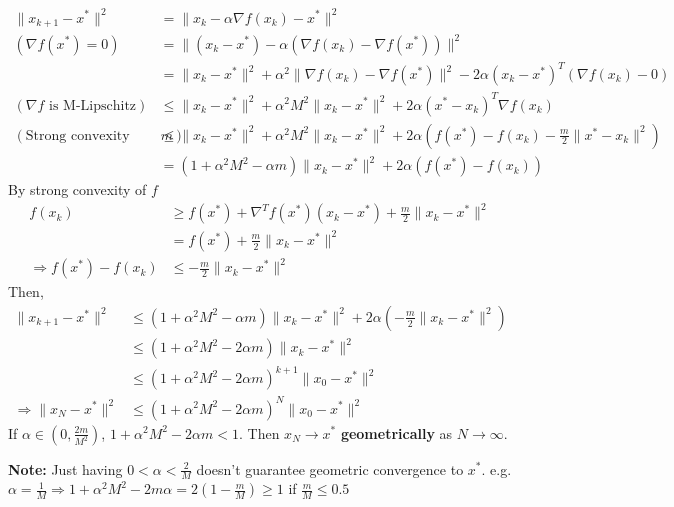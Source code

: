 \documentclass[11pt]{elegantbook}
\begin{document}
\begin{equation}
    \begin{aligned}
        \|x_{k+1}-x^*\|^2&=\|x_k-\alpha \nabla f(x_k)-x^*\|^2\\
        (\nabla f(x^*)=0)\quad \quad &=\|(x_k-x^*)-\alpha (\nabla f(x_k)-\nabla f(x^*))\|^2\\
        &=\|x_k-x^*\|^2+\alpha^2\|\nabla f(x_k)-\nabla f(x^*)\|^2-2\alpha(x_k-x^*)^T(\nabla f(x_k)-0)\\
        (\nabla f\text{ is M-Lipschitz})\quad \quad &\leq \|x_k-x^*\|^2+\alpha^2M^2\|x_k-x^*\|^2+2\alpha(x^*-x_k)^T\nabla f(x_k)\\
        (\text{Strong convexity with $m$})\quad &\leq \|x_k-x^*\|^2+\alpha^2M^2\|x_k-x^*\|^2+2\alpha(f(x^*)-f(x_k)-\frac{m}{2}\|x^*-x_k\|^2)\\
        &=(1+\alpha^2M^2-\alpha m)\|x_k-x^*\|^2+2\alpha (f(x^*)-f(x_k))
    \end{aligned}
    \nonumber
\end{equation}
By strong convexity of $f$
\begin{equation}
    \begin{aligned}
        f(x_k)&\geq f(x^*)+\nabla^T f(x^*)(x_k-x^*)+\frac{m}{2}\|x_k-x^*\|^2\\
        &= f(x^*)+\frac{m}{2}\|x_k-x^*\|^2\\
        \Rightarrow	f(x^*)-f(x_k)&\leq -\frac{m}{2}\|x_k-x^*\|^2
    \end{aligned}
    \nonumber
\end{equation}
Then,
\begin{equation}
    \begin{aligned}
        \|x_{k+1}-x^*\|^2&\leq (1+\alpha^2M^2-\alpha m)\|x_k-x^*\|^2+2\alpha (-\frac{m}{2}\|x_k-x^*\|^2)\\
        &\leq (1+\alpha^2M^2-2\alpha m)\|x_k-x^*\|^2\\
        &\leq (1+\alpha^2M^2-2\alpha m)^{k+1}\|x_0-x^*\|^2\\
        \Rightarrow	\|x_{N}-x^*\|^2&\leq (1+\alpha^2M^2-2\alpha m)^N\|x_0-x^*\|^2
    \end{aligned}
    \nonumber
\end{equation}
If $\alpha\in(0,\frac{2m}{M^2})$, $1+\alpha^2M^2-2\alpha m<1$. Then $x_N \rightarrow x^*$ \textbf{geometrically} as $N \rightarrow \infty$.

\textbf{Note: }Just having $0<\alpha<\frac{2}{M}$ doesn't guarantee geometric convergence to $x^*$. e.g. $\alpha=\frac{1}{M} \Rightarrow 1+\alpha^2M^2-2m\alpha=2(1-\frac{m}{M})\geq 1$ if $\frac{m}{M}\leq 0.5$
\end{document}
